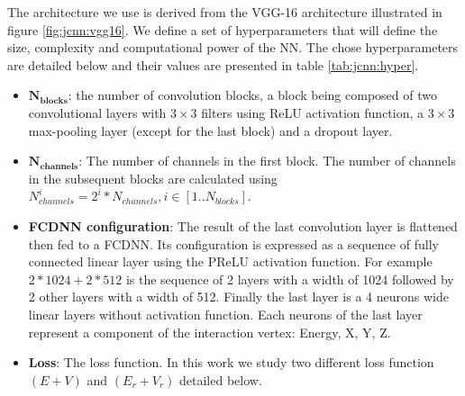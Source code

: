 The architecture we use is derived from the VGG-16 architecture \cite{simonyan_very_2015} illustrated in figure \ref{fig:jcnn:vgg16}. We define a set of hyperparameters that will define the size, complexity and computational power of the NN. The chose hyperparameters are detailed below and their values are presented in table \ref{tab:jcnn:hyper}.
\begin{itemize}
  \item $\mathbf{N_{blocks}}$: the number of convolution blocks, a block being composed of two convolutional layers with $3\times3$ filters using ReLU activation function, a $3\times3$ max-pooling layer (except for the last block) and a dropout layer.
  \item $\mathbf{N_{channels}}$: The number of channels in the first block. The number of channels in the subsequent blocks are calculated using $N^i_{channels} = 2^{i} * N_{channels}, i \in [1..N_{blocks}]$.
  \item \textbf{FCDNN configuration}: The result of the last convolution layer is flattened then fed to a FCDNN. Its configuration is expressed as a sequence of fully connected linear layer using the PReLU activation function. For example $2 * 1024 + 2 * 512$ is the sequence of 2 layers with a width of 1024 followed by 2 other layers with a width of 512. Finally the last layer is a 4 neurons wide linear layers without activation function. Each neurons of the last layer represent a component of the interaction vertex: Energy, X, Y, Z.
  \item \textbf{Loss}: The loss function. In this work we study two different loss function $(E+V)$ and $(E_r + V_r)$ detailed below.
\end{itemize}


